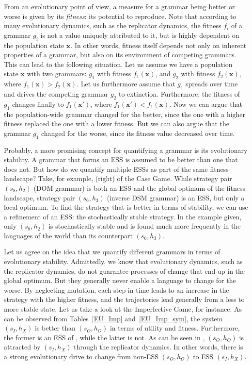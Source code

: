\documentclass[output=paper,hidelinks]{langscibook}
\begin{document}
From an evolutionary point of view, a measure for a grammar being better or worse is given by its \emph{fitness}: its potential to reproduce. Note that according to many evolutionary dynamics, such as the replicator dynamics, the fitness $f_i$ of a grammar $g_i$ is not a value uniquely attributed to it, but is highly dependent on the population state $\mathbf{x}$.
In other words, fitness itself depends not only on inherent properties of a grammar, but also on its environment of competing grammars. This can lead to the following situation. Let us assume we have a population state $\mathbf{x}$ with two grammars: $g_1$ with fitness $f_1(\mathbf{x})$, and $g_2$ with fitness $f_2(\mathbf{x})$, where $f_1(\mathbf{x}) > f_2(\mathbf{x})$. Let us furthermore assume that $g_1$ spreads over time and drives the competing grammar $g_2$ to extinction. Furthermore, the fitness of $g_1$ changes finally to $f_1(\mathbf{x}')$, where $f_1(\mathbf{x}') < f_1(\mathbf{x})$. Now we can argue that the population-wide grammar changed for the better, since the one with a higher fitness replaced the one with a lower fitness. But we can also argue that the grammar $g_1$ changed for the worse, since its fitness value decreased over time. 

Probably, a more promising concept for quantifying a grammar is its evolutionary stability. A grammar that forms an ESS is assumed to be better than one that does not. But how do we quantify multiple ESSs as part of the same fitness landscape?
Take, for example,  (right) of the Case Game. While strategy pair $(s_8,h_2)$ (DOM grammar) is both an ESS and the global optimum of the fitness landscape, strategy pair $(s_6,h_3)$ (inverse DSM grammar) is an ESS, but only a local optimum. To find the strategy that is better in terms of stability, we can use a refinement of an ESS: the stochastically stable strategy. In the example given, only $(s_8,h_2)$ is stochastically stable and is found much more frequently in the languages of the world than its counterpart $(s_6,h_3)$.

Let us agree on the idea that we quantify different grammars in terms of evolutionary stability. Admittedly, we know that evolutionary dynamics, such as the replicator dynamics, do not guarantee processes of change that end up in the global optimum. But they generally never enable a language to change for the worse. By neglecting mutation, each step in time leads to an increase in the strategy with the higher fitness, and the trajectories lead generally from a less to more stable state.
Let us take a look at the Imperfective Game, for instance. As can be observed from Tables~\ref{EU_Imp} and~\ref{EU_Imp_sym}, the system $(s_I,h_X)$ is better than  $(s_O,h_O)$ in terms of utility and fitness. Furthermore, the former is an ESS of , while the latter is not. As can be seen in , $(s_O,h_O)$ is attracted by $(s_I,h_X)$ through the replicator dynamics. In other words, there is a strong evolutionary drive to change from non-ESS $(s_O,h_O)$ to ESS $(s_I,h_X)$. 
\end{document}
